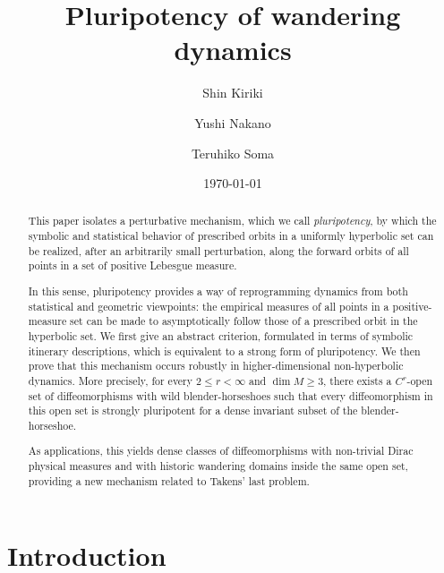 \documentclass{amsart}
\title[Pluripotency  of wandering dynamics]
{Pluripotency of wandering dynamics}
\author{\sc Shin Kiriki}
\author{\sc Yushi Nakano}
\author{\sc Teruhiko Soma}
\date{\today}
\theoremstyle{definition}
\numberwithin{equation}{section}
\numberwithin{figure}{section}
\begin{document}
\begin{abstract}
This paper isolates a perturbative mechanism, which we call \emph{pluripotency},
by which the symbolic and statistical behavior of prescribed orbits
in a uniformly hyperbolic set can be realized, after an arbitrarily small perturbation,
along the forward orbits of all points in a set of positive Lebesgue measure.

In this sense, pluripotency provides a way of reprogramming dynamics from both statistical and geometric viewpoints: the empirical measures of all points in a positive-measure set can be made to asymptotically follow those of a prescribed orbit in the hyperbolic set. We first give an abstract criterion, formulated in terms of symbolic itinerary descriptions, which is equivalent to a strong form of pluripotency. We then prove that this mechanism occurs robustly in higher-dimensional non-hyperbolic dynamics. More precisely, for every $2\le r<\infty$ and $\dim M\ge 3$, there exists a $C^r$-open set of diffeomorphisms with wild blender-horseshoes such that every diffeomorphism in this open set is strongly pluripotent for a dense invariant subset of the blender-horseshoe. 

As applications, this yields dense classes of diffeomorphisms with non-trivial Dirac physical measures and with historic wandering domains inside the same open set, providing a new mechanism related to Takens' last problem.


\end{abstract}
\maketitle

\tableofcontents






\section{Introduction}\label{S_Introduction}
\end{document}
